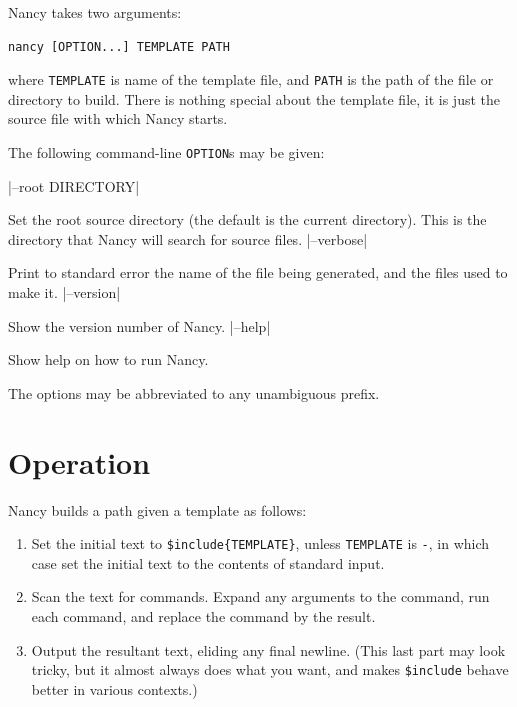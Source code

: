 \documentclass[a4paper,english]{scrartcl}
\begin{document}
Nancy takes two arguments:

\begin{verbatim}
nancy [OPTION...] TEMPLATE PATH
\end{verbatim}

\noindent where \verb|TEMPLATE| is name of the template file, and \verb|PATH| is the path of the file or directory to build. There is nothing special about the template file, it is just the source file with which Nancy starts.

The following command-line \verb|OPTION|s may be given:

\begin{description}
|--root DIRECTORY|
\item[\UseVerb{root}]Set the root source directory (the default is the current directory). This is the directory that Nancy will search for source files.
|--verbose|
\item[\UseVerb{verbose}]Print to standard error the name of the file being generated, and the files used to make it.
|--version|
\item[\UseVerb{version}]Show the version number of Nancy.
|--help|
\item[\UseVerb{help}]Show help on how to run Nancy.
\end{description}

The options may be abbreviated to any unambiguous prefix.

\section{Operation}
\label{operation}

Nancy builds a path given a template as follows:

\begin{enumerate}
\item Set the initial text to \verb|$include{TEMPLATE}|, unless \verb|TEMPLATE| is \verb|-|, in which case set the initial text to the contents of standard input.
\item Scan the text for commands. Expand any arguments to the command, run each command, and replace the command by the result.
\item Output the resultant text, eliding any final newline. (This last part may look tricky, but it almost always does what you want, and makes \verb|$include| behave better in various contexts.)
\end{enumerate}
\end{document}
